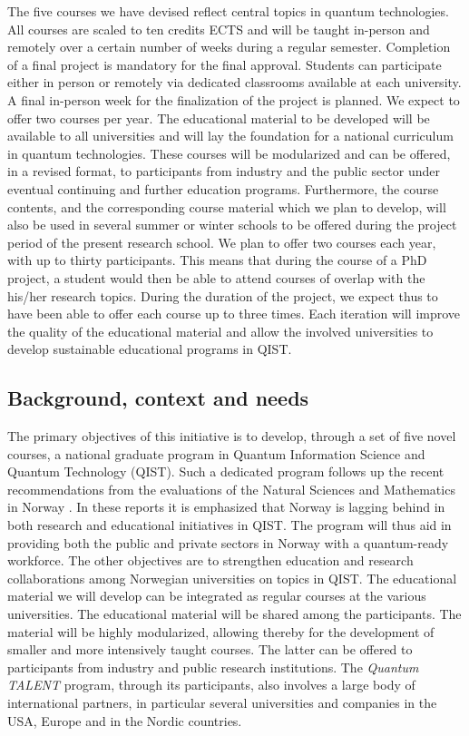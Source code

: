 \documentclass{scrreprt}
\begin{document}
The five courses we have devised reflect central topics in quantum
technologies. All courses are scaled to ten credits ECTS and will be
taught in-person and remotely over a certain number of weeks during a
regular semester. Completion of a final project is mandatory
for the final approval.  Students can participate either in person or
remotely via dedicated classrooms available at each university.  A
final in-person week for the finalization of the project is planned.
We expect to offer two courses per year. The educational material to
be developed will be available to all universities and will lay the
foundation for a national curriculum in quantum technologies. These
courses will be modularized and can be offered, in a revised format,
to participants from industry and the public sector under eventual
continuing and further education programs.
Furthermore, the course contents, and the corresponding course material which we plan to develop, will also be used in several summer or winter schools to be offered during the project period of the present research school.
We plan to offer two courses each year, with up to thirty participants. This means that during the course of a PhD project, a student would then be able to attend courses of overlap with the his/her research topics. 
During the duration of the project, we expect thus to have been able to offer each course up to three times. 
Each iteration will improve the quality of the educational material and allow the involved universities to develop sustainable educational programs in QIST.

\subsection{Background, context and needs}

The primary objectives of this initiative is to develop, through a set of five novel courses, a national graduate program in Quantum Information Science and Quantum Technology (QIST). Such a dedicated program follows up the recent recommendations from the evaluations of the Natural Sciences and Mathematics in Norway \cite{evalnat,evalmat}. In these reports it is emphasized that Norway is lagging behind in both research and educational initiatives in QIST. 
The program will thus aid in providing both the public and private sectors in Norway with a quantum-ready workforce. 
The other objectives are to strengthen education and research collaborations among Norwegian universities on topics in QIST. 
The educational material we will develop can be integrated as regular courses at the various universities. The educational material will be shared among the participants. The material will be highly modularized, allowing thereby for the development of smaller and more intensively taught courses. The   latter can be offered to participants from industry and public research institutions. 
The \textit{Quantum TALENT} program, through its participants, also involves a large body of international partners, in particular several universities and companies in the USA, Europe  and in the Nordic countries.
\end{document}
